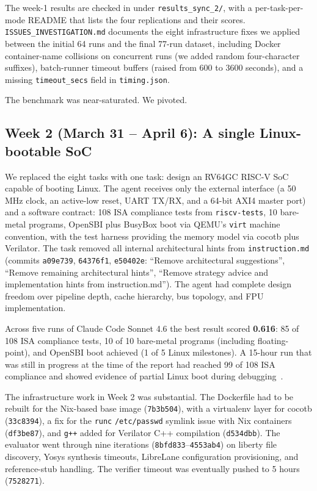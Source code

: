 \documentclass{article}
\begin{document}
The week-1 results are checked in under \texttt{results\_sync\_2/}, with a
per-task-per-mode README that lists the four replications and their scores.
\texttt{ISSUES\_INVESTIGATION.md} documents the eight infrastructure fixes we applied
between the initial 64 runs and the final 77-run dataset, including Docker container-name
collisions on concurrent runs (we added random four-character suffixes), batch-runner
timeout buffers (raised from 600 to 3600 seconds), and a missing \texttt{timeout\_secs}
field in \texttt{timing.json}.

The benchmark was near-saturated. We pivoted.

\subsection{Week 2 (March 31 -- April 6): A single Linux-bootable SoC}

We replaced the eight tasks with one task: design an RV64GC RISC-V SoC capable of booting
Linux. The agent receives only the external interface (a 50\,MHz clock, an active-low
reset, UART TX/RX, and a 64-bit AXI4 master port) and a software contract: 108 ISA
compliance tests from \texttt{riscv-tests}, 10 bare-metal programs, OpenSBI plus BusyBox
boot via QEMU's \texttt{virt} machine convention, with the test harness providing the
memory model via cocotb plus Verilator. The task removed all internal architectural hints
from \texttt{instruction.md} (commits \texttt{a09e739}, \texttt{64376f1},
\texttt{e50402e}: ``Remove architectural suggestions'', ``Remove remaining architectural
hints'', ``Remove strategy advice and implementation hints from instruction.md''). The
agent had complete design freedom over pipeline depth, cache hierarchy, bus topology, and
FPU implementation.

Across five runs of Claude Code Sonnet 4.6 the best result scored \textbf{0.616}: 85 of 108
ISA compliance tests, 10 of 10 bare-metal programs (including floating-point), and OpenSBI
boot achieved (1 of 5 Linux milestones). A 15-hour run that was still in progress at the
time of the report had reached 99 of 108 ISA compliance and showed evidence of partial
Linux boot during debugging~\citep{spec2gdsbench-w2}.

The infrastructure work in Week 2 was substantial. The Dockerfile had to be rebuilt for
the Nix-based base image (\texttt{7b3b504}), with a virtualenv layer for cocotb
(\texttt{33c8394}), a fix for the \texttt{runc} \texttt{/etc/passwd} symlink issue with Nix
containers (\texttt{df3be87}), and \texttt{g++} added for Verilator C++ compilation
(\texttt{d534dbb}). The evaluator went through nine iterations
(\texttt{8bfd833}--\texttt{4553ab4}) on liberty file discovery, Yosys synthesis timeouts,
LibreLane configuration provisioning, and reference-stub handling. The verifier timeout
was eventually pushed to 5 hours (\texttt{7528271}).
\end{document}
